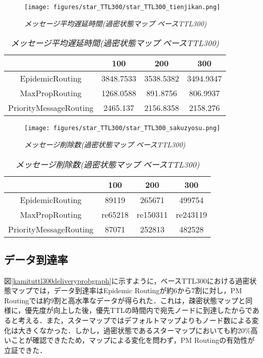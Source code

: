 \documentclass[11pt]{icsthesis}
\begin{document}
\newpage

\begin{figure}[h]
\centering
\texttt{[image: figures/star\_TTL300/star\_TTL300\_tienjikan.png]}
\caption[]{\it{メッセージ平均遅延時間(過密状態マップ ベースTTL300)}}
\label{kamituttl300latencyavggraph}
\end{figure}

\begin{table}[H]
 \begin{center}
      \caption[]{\it{メッセージ平均遅延時間(過密状態マップ ベースTTL300)}}
      \label{kamituttl300latencyavg}
      \begin{tabular}{|c|c|c|c|}
\hline
&100&200&300\\
\hline
EpidemicRouting&3848.7533&3538.5382&3494.9347\\
\hline
MaxPropRouting&1268.0588&891.8756&806.9937\\
\hline
PriorityMessageRouting&2465.137&2156.8358&2158.276\\
\hline
      \end{tabular}
    \end{center}
\end{table}

\begin{figure}[h]
\centering
\texttt{[image: figures/star\_TTL300/star\_TTL300\_sakuzyosu.png]}
\caption[]{\it{メッセージ削除数(過密状態マップ ベースTTL300)}}
\label{kamituttl300droppedgraph}
\end{figure}

\begin{table}[H]
 \begin{center}
      \caption[]{\it{メッセージ削除数(過密状態マップ ベースTTL300)}}
      \label{kamituttl300dropped}
      \begin{tabular}{|c|c|c|c|}
\hline
&100&200&300\\
\hline
EpidemicRouting&89119&265671&499754\\
\hline
MaxPropRouting&re65218&re150311&re243119\\
\hline
PriorityMessageRouting&87071&252813&482528\\
\hline
      \end{tabular}
    \end{center}
\end{table}

\subsection{データ到達率}
図\ref{kamituttl300deliveryprobgraph}に示すように，ベースTTL300における過密状態マップでは，データ到達率はEpidemic Routingが約6から7割に対し，PM Routingでは約9割と高水準なデータが得られた．これは，疎密状態マップと同様に，優先度が向上した後，優先TTLの時間内で宛先ノードに到達したからであると考える．また，スターマップではデフォルトマップよりもノード数による変化は大きくなかった．しかし，過密状態であるスターマップにおいても約20\%高いことが確認できたため，マップによる変化を問わず，PM Routingの有効性が立証できた．
\end{document}
